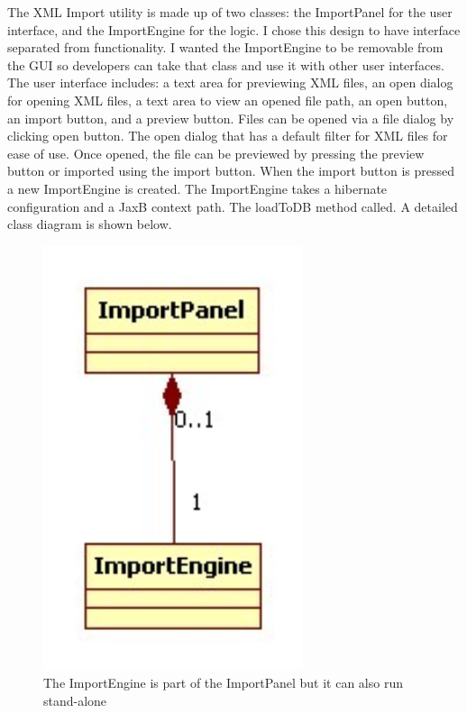 The XML Import utility is made up of two classes: the ImportPanel for the user interface, and the ImportEngine for the logic. I chose this design to have interface separated from functionality. I wanted the ImportEngine to be removable from the GUI so developers can take that class and use it with other user interfaces. The user interface includes: a text area for previewing XML files, an open dialog for opening XML files, a text area to view an opened file path, an open button, an import button, and a preview button. Files can be opened via a file dialog by clicking open button. The open dialog that has a default filter for XML files for ease of use. Once opened, the file can be previewed by pressing the preview button or imported using the import button. When the import button is pressed a new ImportEngine is created. The ImportEngine takes a hibernate configuration and a JaxB context path. The loadToDB method called. A detailed class diagram is shown below. 

\begin{figure}[h]
	\centering
		\includegraphics[width=3.00in]{Images/ImportClasses.jpg}
	\caption{The ImportEngine is part of the ImportPanel but it can also run stand-alone}
	\label{fig:ImportClasses}
\end{figure}

